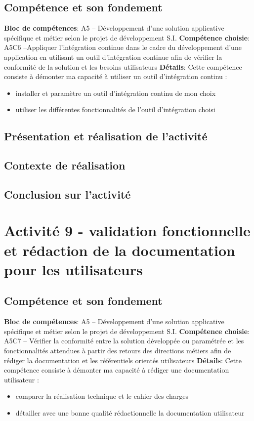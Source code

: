 \documentclass[a4paper, 11pt]{report}
\begin{document}
\subsection{Compétence et son fondement}
\textbf{Bloc de compétences}: A5 – Développement d’une solution applicative spécifique et métier selon le projet de développement S.I.
\newline
\textbf{Compétence choisie}: A5C6 –Appliquer l’intégration continue dans le cadre du développement d’une application en utilisant un outil d’intégration continue afin de vérifier la conformité de la solution et les besoins utilisateurs
\newline
\textbf{Détails}: Cette compétence consiste à démonter ma capacité à utiliser un outil d’intégration continu :
\begin{itemize}
  \item installer et paramètre un outil d’intégration continu de mon choix
  \item utiliser les différentes fonctionnalités de l’outil d’intégration choisi
\end{itemize}
\subsection{Présentation et réalisation de l'activité}
\subsection{Contexte de réalisation}
\subsection{Conclusion sur l'activité}

\section{Activité 9 - validation fonctionnelle et rédaction de la documentation pour les utilisateurs}
\subsection{Compétence et son fondement}
\textbf{Bloc de compétences}: A5 – Développement d’une solution applicative spécifique et métier selon le projet de développement S.I.
\newline
\textbf{Compétence choisie}: A5C7 – Vérifier la conformité entre la solution développée ou paramétrée et les fonctionnalités attendues à partir des retours des directions métiers afin de rédiger la documentation et les référentiels orientés utilisateurs
\newline
\textbf{Détails}: Cette compétence consiste à démonter ma capacité à rédiger une documentation utilisateur :
\begin{itemize}
  \item comparer la réalisation technique et le cahier des charges
  \item détailler avec une bonne qualité rédactionnelle la documentation utilisateur
\end{itemize}
\end{document}
